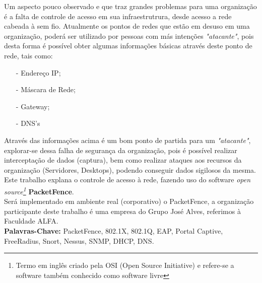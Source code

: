 \documentclass[12pt, brazil, ruledheader, pnumromarab,normaltoc]{abnt}
\begin{document}

\begin{resumo}

Um aspecto pouco observado e que traz grandes problemas para uma organização é a falta de controle de acesso em sua infraestrutrura, desde acesso a rede cabeada à sem fio. Atualmente os pontos de redes que estão em desuso em uma organização, poderá ser utilizado por pessoas com más intenções \emph{"atacante"}, pois desta forma é possível obter algumas informações básicas através deste ponto de rede, tais como:
\begin{enumerate}
\item[-]{Endereço IP};
\item[-]{Máscara de Rede};
\item[-]{Gateway};
\item[-]{DNS's}
\end{enumerate}
\par Através das informações acima é um bom ponto de partida para um \emph{"atacante"}, explorar-se dessa falha de segurança da organização, pois é possível realizar interceptação de dados (captura), bem como realizar ataques aos recursos da organização (Servidores, Desktops), podendo conseguir dados sigilosos da mesma. Este trabalho explana o controle de acesso à rede, fazendo uso do software \textit{open source\footnote{Termo em inglês criado pela OSI (Open Source Initiative) e refere-se a software também conhecido como software livre}} \textbf{PacketFence}.\\ Será implementado em ambiente real (corporativo) o PacketFence, a organização participante deste trabalho é uma empresa do Grupo José Alves, referimos à Faculdade ALFA.\\

\textbf{Palavras-Chave:} PacketFence, 802.1X, 802.1Q, EAP, Portal Captive, FreeRadius, Snort, Nessus, SNMP, DHCP, DNS.

\end{resumo}
\end{document}
